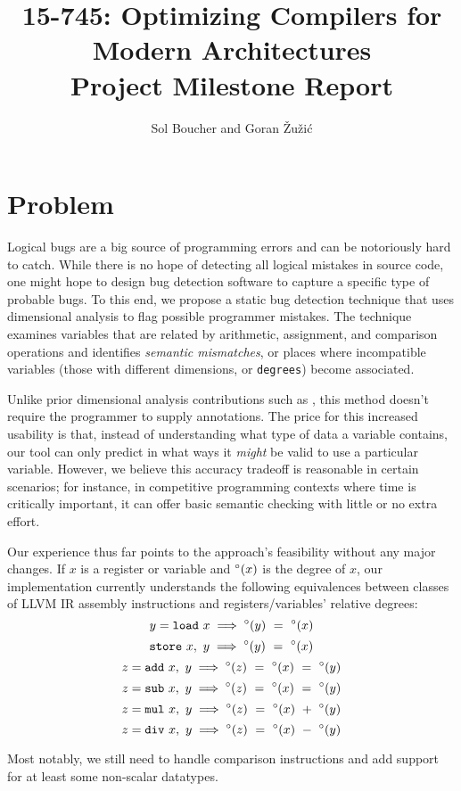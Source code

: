 \documentclass[12pt]{article}
\title{{\small 15-745: Optimizing Compilers for Modern Architectures} \\ Project Milestone Report}
\author{Sol Boucher and Goran \v{Z}u\v{z}i\'c}
\begin{document}
\maketitle

\section{Problem}

Logical bugs are a big source of programming errors and can be notoriously hard to catch.
While there is no hope of detecting all logical mistakes in source code, one might hope to design bug detection software to capture a specific type of probable bugs.
To this end, we propose a static bug detection technique that uses dimensional analysis to flag possible programmer mistakes.
The technique examines variables that are related by arithmetic, assignment, and comparison operations and identifies \textit{semantic mismatches}, or places where incompatible variables (those with different dimensions, or \texttt{degrees}) become associated.

Unlike prior dimensional analysis contributions such as \cite{hilfinger1988ada}, this method doesn't require the programmer to supply annotations.
The price for this increased usability is that, instead of understanding what type of data a variable contains, our tool can only predict in what ways it \textit{might} be valid to use a particular variable.
However, we believe this accuracy tradeoff is reasonable in certain scenarios; for instance, in competitive programming contexts where time is critically important, it can offer basic semantic checking with little or no extra effort.

Our experience thus far points to the approach's feasibility without any major changes.
If $x$ is a register or variable and $\degree(x)$ is the degree of $x$, our implementation currently understands the following equivalences between classes of LLVM IR assembly instructions and registers/variables' relative degrees:
\[y = \mathtt{load}\ x \implies \degree(y)\ =\ \degree(x)\]
\[\mathtt{store}\ x,\ y \implies \degree(y)\ =\ \degree(x)\]
\[z = \mathtt{add}\ x,\ y \implies \degree(z)\ =\ \degree(x)\ =\ \degree(y)\]
\[z = \mathtt{sub}\ x,\ y \implies \degree(z)\ =\ \degree(x)\ =\ \degree(y)\]
\[z = \mathtt{mul}\ x,\ y \implies \degree(z)\ =\ \degree(x)\ +\ \degree(y)\]
\[z = \mathtt{div}\ x,\ y \implies \degree(z)\ =\ \degree(x)\ -\ \degree(y)\]

Most notably, we still need to handle comparison instructions and add support for at least some non-scalar datatypes.
\end{document}
